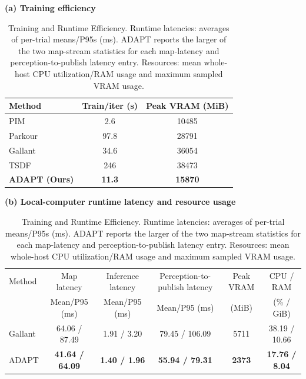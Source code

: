 \documentclass[letterpaper, 10 pt, conference]{ieeeconf/ieeeconf}
\DeclareRobustCommand{\RevisionAdd}[1]{{\color{red}#1}}
\begin{document}
\begin{table}[t]
\centering
\caption{Training \RevisionAdd{and Runtime }Efficiency. \RevisionAdd{Runtime latencies}: \RevisionAdd{averages of per-trial means/P95s }(\RevisionAdd{ms}). \RevisionAdd{ADAPT reports the larger of the two map-stream statistics for each map-latency and perception-to-publish latency entry}. \RevisionAdd{Resources: mean whole-host CPU utilization}/\RevisionAdd{RAM usage and maximum sampled VRAM usage}.}
\label{tab:efficiency}
\small
\setlength{\tabcolsep}{6pt}
\RevisionAdd{\textbf{(a) Training efficiency}}\\[3pt]
\begin{tabular}{lcc}
\toprule[1.0pt]
Method & Train/iter (s) & \RevisionAdd{Peak VRAM (MiB}) \\
\midrule[0.8pt]
PIM~\cite{long2025learning} & 2.6 & 10485 \\
Parkour~\cite{zhuang2024humanoid} & 97.8 & 28791 \\
Gallant~\cite{Ben_2025_Gallant} & 34.6 & 36054 \\
TSDF & 246 & 38473 \\
\textbf{\RevisionAdd{ADAPT (}Ours\RevisionAdd{)}} & \textbf{11.3} & \textbf{15870} \\
\bottomrule[1.0pt]
\end{tabular}
\par\vspace{6pt}
\RevisionAdd{\textbf{(b) Local-computer runtime latency and resource usage}}\\[3pt]
\setlength{\tabcolsep}{4pt}
\begin{tabular}{lccccc}
\toprule[1.0pt]
\RevisionAdd{Method }& \RevisionAdd{Map latency }& \RevisionAdd{Inference latency }& \RevisionAdd{Perception-to-publish latency }& \RevisionAdd{Peak VRAM }& \RevisionAdd{CPU / RAM }\\
 & \RevisionAdd{Mean/P95 (ms) }& \RevisionAdd{Mean/P95 (ms) }& \RevisionAdd{Mean/P95 (ms) }& \RevisionAdd{(MiB) }& \RevisionAdd{(\% / GiB) }\\
\midrule[0.8pt]
\RevisionAdd{Gallant }& \RevisionAdd{64.06 / 87.49 }& \RevisionAdd{1.91 / 3.20 }& \RevisionAdd{79.45 / 106.09 }& \RevisionAdd{5711 }& \RevisionAdd{38.19 / 10.66 }\\
\RevisionAdd{ADAPT }& \RevisionAdd{\textbf{41.64 / 64.09} }& \RevisionAdd{\textbf{1.40 / 1.96} }& \RevisionAdd{\textbf{55.94 / 79.31} }& \RevisionAdd{\textbf{2373} }& \RevisionAdd{\textbf{17.76 / 8.04} }\\
\bottomrule[1.0pt]
\end{tabular}
\end{table}
\end{document}
